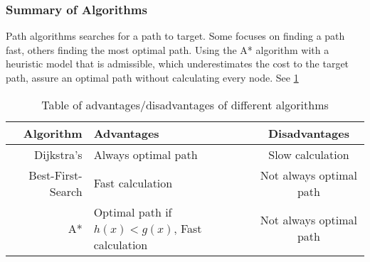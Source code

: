   \subsubsection{Summary of Algorithms}

  Path algorithms searches for a path to target. Some focuses on finding a path fast, others finding the most optimal path. Using the A* algorithm with a heuristic model that is admissible, which underestimates the cost to the target path, assure an optimal path without calculating every node. See \cref{tbl:scheme}
  
  \begin{table}[ht!]
    \centering
    \begin{tabular}{|r|l|c|}
      \hline
      \textbf{Algorithm} & \textbf{Advantages} & \textbf{Disadvantages} \\
      \hline
      Dijkstra's & Always optimal path & Slow calculation \\
      Best-First-Search & Fast calculation & Not always optimal path \\
      A* & Optimal path if $h(x)<g(x)$, Fast calculation & Not always optimal path \\
      \hline
    \end{tabular}
    \caption{Table of advantages/disadvantages of different algorithms}
    \label{tbl:scheme}
  \end{table}